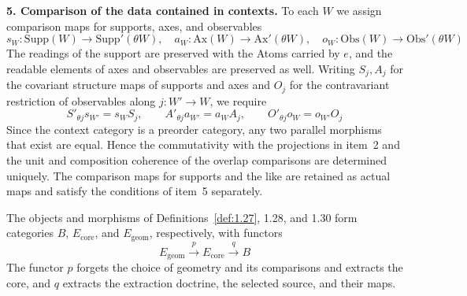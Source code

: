 \begin{definition}
\textbf{5. Comparison of the data contained in contexts.} To each $W$ we
assign comparison maps for supports, axes, and observables
\[
s_W:\mathrm{Supp}(W)\to\mathrm{Supp}'(\theta W),\quad
a_W:\mathrm{Ax}(W)\to\mathrm{Ax}'(\theta W),\quad
o_W:\mathrm{Obs}(W)\to\mathrm{Obs}'(\theta W)
\]
The readings of the support are preserved with the Atoms carried by $e$, and
the readable elements of axes and observables are preserved as well.
Writing $S_j,A_j$ for the covariant structure maps of supports and axes and
$O_j$ for the contravariant restriction of observables along $j:W'\to W$, we
require
\begin{equation*}
S'_{\theta j}s_{W'}=s_WS_j,\qquad
A'_{\theta j}a_{W'}=a_WA_j,\qquad
O'_{\theta j}o_W=o_{W'}O_j
\tag{1.14}\label{eq:1.14}
\end{equation*}
Since the context category is a preorder category, any two parallel morphisms
that exist are equal.
Hence the commutativity with the projections in item~2 and the unit and
composition coherence of the overlap comparisons are determined uniquely.
The comparison maps for supports and the like are retained as actual maps and
satisfy the conditions of item~5 separately.

\end{definition}

\begin{theorem}\label{thm:1.31}

The objects and morphisms of Definitions~\ref{def:1.27}, 1.28, and 1.30 form
categories $B$, $E_{\mathrm{core}}$, and $E_{\mathrm{geom}}$, respectively,
with functors
\begin{equation*}
E_{\mathrm{geom}}
\xrightarrow{\,p\,}
E_{\mathrm{core}}
\xrightarrow{\,q\,}
B
\tag{1.15}\label{eq:1.15}
\end{equation*}
The functor $p$ forgets the choice of geometry and its comparisons and extracts
the core, and $q$ extracts the extraction doctrine, the selected source, and
their maps.

\end{theorem}

